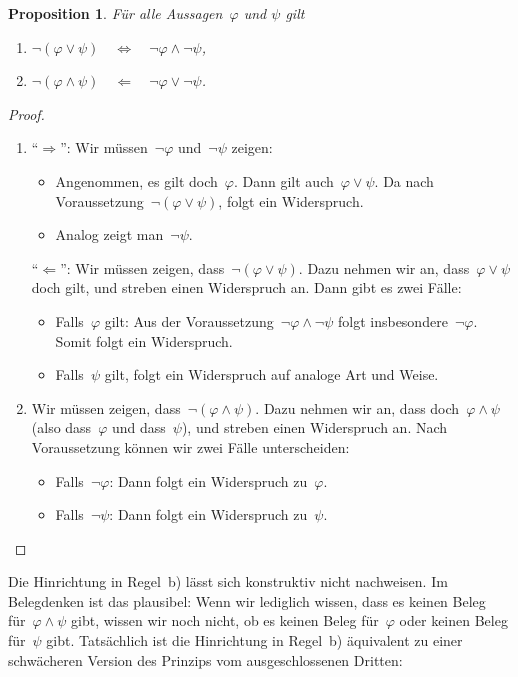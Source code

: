 \documentclass[a4paper,ngerman,12pt]{scrartcl}
\theoremstyle{definition}
\theoremstyle{plain}
\newtheorem{prop}[defn]{Proposition}
\theoremstyle{remark}
\renewcommand{\_}{\mathpunct{.}\,}
\newcommand{\?}{\,{:}\,}
\begin{document}
\begin{prop}Für alle Aussagen~$\varphi$ und $\psi$ gilt
\begin{enumerate}
\item $\neg(\varphi \vee \psi) \quad\Longleftrightarrow\quad \neg\varphi \wedge
\neg\psi$,
\item $\neg(\varphi \wedge \psi) \quad\Longleftarrow\quad \neg\varphi \vee
\neg\psi$.
\end{enumerate}
\end{prop}
\begin{proof}\begin{enumerate}
\item "`$\Rightarrow$"': Wir müssen~$\neg\varphi$ und~$\neg\psi$ zeigen:
\begin{itemize}
\item Angenommen, es gilt doch~$\varphi$. Dann gilt auch~$\varphi \vee \psi$. Da
nach Voraussetzung~$\neg(\varphi \vee \psi)$, folgt ein Widerspruch.
\item Analog zeigt man~$\neg\psi$.
\end{itemize}

"`$\Leftarrow$"': Wir müssen zeigen, dass~$\neg(\varphi \vee \psi)$. Dazu
nehmen wir an, dass~$\varphi \vee \psi$ doch gilt, und streben einen Widerspruch an.
Dann gibt es zwei Fälle:
\begin{itemize}
\item Falls~$\varphi$ gilt: Aus der Voraussetzung~$\neg\varphi \wedge \neg\psi$
folgt insbesondere~$\neg\varphi$. Somit folgt ein Widerspruch.
\item Falls~$\psi$ gilt, folgt ein Widerspruch auf analoge Art und
Weise.
\end{itemize}

\item
Wir müssen zeigen, dass~$\neg(\varphi \wedge \psi)$. Dazu nehmen wir an, dass
doch~$\varphi \wedge \psi$ (also dass~$\varphi$ und dass~$\psi$), und streben
einen Widerspruch an. Nach Voraussetzung können wir zwei Fälle unterscheiden:
\begin{itemize}
\item Falls~$\neg\varphi$: Dann folgt ein Widerspruch zu~$\varphi$.
\item Falls~$\neg\psi$: Dann folgt ein Widerspruch zu~$\psi$.\qedhere
\end{itemize}
\end{enumerate}
\end{proof}

Die Hinrichtung in Regel~b) lässt sich konstruktiv nicht nachweisen. Im
Belegdenken ist das plausibel: Wenn wir lediglich wissen, dass es keinen Beleg
für~$\varphi \wedge \psi$ gibt, wissen wir noch nicht, ob es keinen Beleg
für~$\varphi$ oder keinen Beleg für~$\psi$ gibt. Tatsächlich ist die
Hinrichtung in Regel~b) äquivalent zu einer schwächeren Version des Prinzips
vom ausgeschlossenen Dritten:
\end{document}
